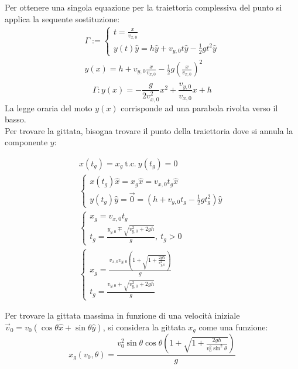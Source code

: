 \documentclass{article}
\numberwithin{equation}{subsection}
\begin{document}
Per ottenere una singola equazione per la traiettoria complessiva 
del punto si applica la sequente sostituzione:
\begin{gather*}
    \Gamma:=
    \begin{cases}
        \displaystyle t = \frac{x}{v_{x,0}}\\
        {y}(t)\hat{y}=h\hat{y}+v_{y,0}t\hat{y}-\displaystyle\frac{1}{2}gt^{2}\hat{y}
    \end{cases}\\
    \displaystyle y(x)=h+v_{y,0}\frac{x}{v_{x,0}}-\frac{1}{2}g\left(\frac{x}{v_{x,0}}\right)^{2}\\
\end{gather*}
\begin{equation}
    \Gamma:y(x)\displaystyle=-\frac{g}{2v_{x,0}^{2}}x^{2}+\frac{v_{y,0}}{v_{x,0}}x+h
\end{equation}
La legge oraria del moto $y(x)$ corrisponde ad una parabola rivolta verso 
il basso.\\

Per trovare la gittata, bisogna trovare il punto della traiettoria 
dove si annula la componente $y$:

\begin{gather*}
    x(t_g)=x_g \:\mbox{t.c.}\:y(t_g)=0\\
    \begin{cases}
        x(t_g)\hat{x}=x_g\hat{x}=v_{x,0}t_g\hat{x}\\
        y(t_g)\hat{y}=\vec{0}=\left(h+v_{y,0}t_g-\displaystyle\frac{1}{2}gt_g^{2}\right)\hat{y}
    \end{cases}\\
    \begin{cases}
        x_g=v_{x,0}t_g\\
        t_g=\displaystyle\frac{y_{y,0}\mp\sqrt{v_{y,0}^{2}+2gh}}{g}{,}\:t_g>0  
    \end{cases}\\
    \begin{cases}
        x_g=\displaystyle\frac{v_{x,0}v_{y,0}\left(1+\sqrt{1+\displaystyle\frac{2gh}{v_{y,0}^2}}\right)}{g}\\
        t_g=\displaystyle\frac{v_{y,0}+\sqrt{v_{y,0}^{2}+2gh}}{g}    
    \end{cases}
\end{gather*}

Per trovare la gittata massima in funzione di una velocità 
iniziale $\vec{v}_0 = v_0(\cos\theta\hat{x}+\sin\theta\hat{y})$, 
si considera la gittata $x_g$ come una funzione:
\begin{equation}
    x_g(v_0,\theta)=\displaystyle\frac{v_0^{2}\sin\theta \cos\theta\left(1+\sqrt{1+\displaystyle\frac{2gh}{v_0^2\sin^2\theta}}\right)}{g}
\end{equation}
\end{document}
